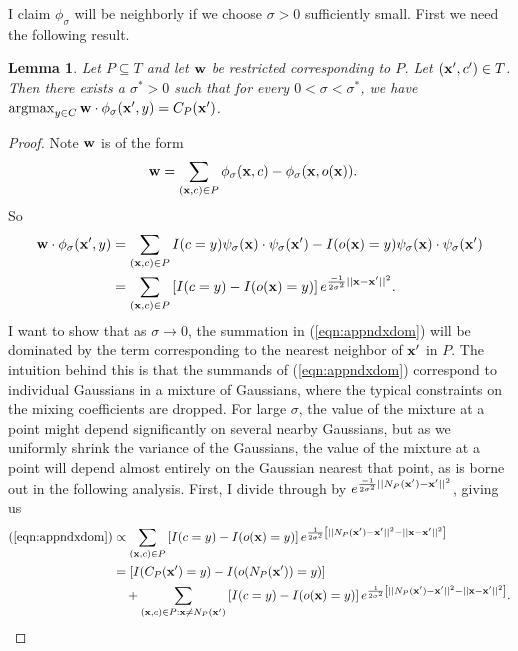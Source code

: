 \documentclass{article}
\newcommand{\argmax}{\operatornamewithlimits{argmax}}
\newcommand{\ls}{ \left[}
\newcommand{\rs}{ \right]}
\newtheorem{lemma}{Lemma}
\begin{document}
I claim $\phi_\sigma$ will be neighborly if we choose $\sigma > 0$ sufficiently small. First we need the following result.

\begin{lemma}
\label{thm:appdxlemma}
Let $P \subseteq T$ and let ${\bf w}$ be restricted corresponding to $P$. Let $({\bf x}',c') \in T$. Then there exists a $\sigma^*>0$ such that for every $0 < \sigma < \sigma^*$, we have $\argmax_{y \in C} {\bf w} \cdot \phi_\sigma({\bf x}',y) = C_P({\bf x}')$.
\end{lemma}
\begin{proof}
Note ${\bf w}$ is of the form
\begin{align*}
{\bf w} 
&= \sum_{({\bf x},c) \in P} \phi_\sigma({\bf x},c) - \phi_\sigma({\bf x},o({\bf x})).
\end{align*}
So 
\begin{align}
{\bf w} \cdot \phi_\sigma({\bf x}',y)
&= \sum_{({\bf x},c) \in P} I(c=y) \psi_\sigma({\bf x}) \cdot \psi_\sigma({\bf x}') - I(o({\bf x})=y) \psi_\sigma({\bf x}) \cdot \psi_\sigma({\bf x}') \\
&= \sum_{({\bf x},c) \in P} \ls I(c=y) - I(o({\bf x})=y) \rs e^{\frac{-1}{2 \sigma^2} ||{\bf x} - {\bf x'} ||^2}. \label{eqn:appndxdom}
\end{align}
I want to show that as $\sigma \rightarrow 0$, the summation in (\ref{eqn:appndxdom}) will be dominated by the term corresponding to the nearest neighbor of ${\bf x}'$ in $P$. The intuition behind this is that the summands of (\ref{eqn:appndxdom}) correspond to individual Gaussians in a mixture of Gaussians, where the typical constraints on the mixing coefficients are dropped. For large $\sigma$, the value of the mixture at a point might depend significantly on several nearby Gaussians, but as we uniformly shrink the variance of the Gaussians, the value of the mixture at a point will depend almost entirely on the Gaussian nearest that point, as is borne out in the following analysis. First, I divide through by $e^{\frac{-1}{2 \sigma^2} ||N_P({\bf x}') - {\bf x'} ||^2}$, giving us
\begin{align}
(\ref{eqn:appndxdom})
&\propto \sum_{({\bf x},c) \in P} \ls I(c=y) - I(o({\bf x})=y) \rs e^{\frac{1}{2 \sigma^2} \ls ||N_P({\bf x}') - {\bf x'} ||^2 - ||{\bf x} - {\bf x'} ||^2 \rs} \\
&= \ls I(C_P({\bf x}')=y) - I(o(N_P({\bf x}'))=y) \rs \nonumber \\
&\quad + \sum_{({\bf x},c) \in P:{\bf x} \neq N_P({\bf x}')} \ls I(c=y) - I(o({\bf x})=y) \rs e^{\frac{1}{2 \sigma^2} \ls ||N_P({\bf x}') - {\bf x'} ||^2 - ||{\bf x} - {\bf x'} ||^2 \rs}. \label{eqn:appndxsep}

\end{align}
\end{proof}
\end{document}
